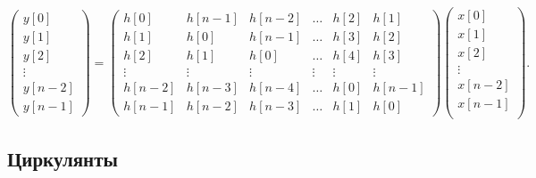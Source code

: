 \[
    \begin{pmatrix}
        y[0]   \\
        y[1]   \\
        y[2]   \\
        \vdots \\
        y[n-2] \\
        y[n-1]
    \end{pmatrix}
    = \begin{pmatrix}
        h[0]   & h[n-1] & h[n-2] & \dots  & h[2]   & h[1]   \\
        h[1]   & h[0]   & h[n-1] & \dots  & h[3]   & h[2]   \\
        h[2]   & h[1]   & h[0]   & \dots  & h[4]   & h[3]   \\
        \vdots & \vdots & \vdots & \vdots & \vdots & \vdots \\
        h[n-2] & h[n-3] & h[n-4] & \dots  & h[0]   & h[n-1] \\
        h[n-1] & h[n-2] & h[n-3] & \dots  & h[1]   & h[0]
    \end{pmatrix}
    \begin{pmatrix}
        x[0]   \\
        x[1]   \\
        x[2]   \\
        \vdots \\
        x[n-2] \\
        x[n-1] \\
    \end{pmatrix} .
\]

\subsection{Циркулянты}

